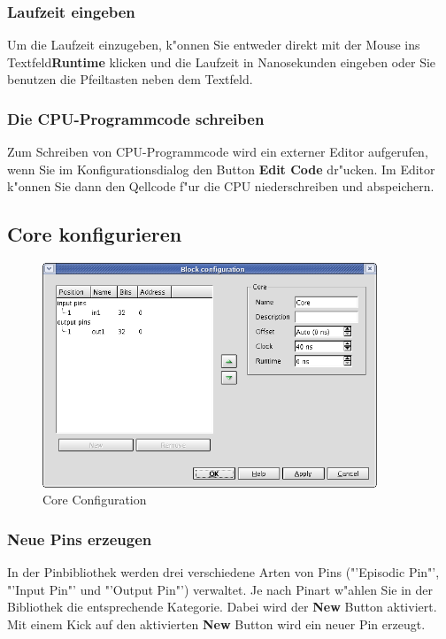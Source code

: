 \documentclass[a4paper,titlepage,12pt,ngerman]{scrbook}
\begin{document}
\subsubsection{Laufzeit eingeben}
Um die Laufzeit einzugeben, k"onnen Sie entweder direkt mit der Mouse ins Textfeld{\bf Runtime} klicken und die Laufzeit in Nanosekunden eingeben oder Sie benutzen die Pfeiltasten neben dem Textfeld. 
\subsubsection{Die CPU-Programmcode schreiben}
Zum Schreiben von CPU-Programmcode wird ein externer Editor aufgerufen, wenn Sie im Konfigurationsdialog den Button {\bf Edit Code} dr"ucken. Im Editor k"onnen Sie dann den Qellcode f"ur die CPU niederschreiben und abspeichern.
 



\subsection{Core konfigurieren}
\begin{figure}[htbp]

\begin{center}

\includegraphics[width=10cm]{CoreBlockConfiguration}

\caption{Core Configuration}\label{test}

\end{center}

\end{figure}
\subsubsection{Neue Pins erzeugen}
In der Pinbibliothek werden drei verschiedene Arten von Pins ("'Episodic Pin"', "'Input Pin"' und "'Output Pin"') verwaltet. Je nach Pinart w"ahlen Sie in der Bibliothek die entsprechende Kategorie. Dabei wird der {\bf New} Button aktiviert. Mit einem Kick auf den aktivierten {\bf New} Button wird ein neuer Pin erzeugt. \par
\end{document}
